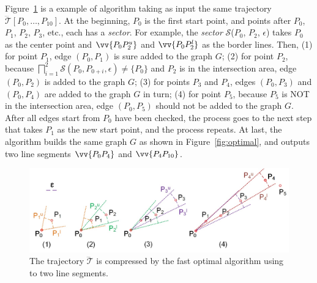 {\begin{example}
	\label{exm-alg-optped}
	Figure~\ref{fig:optped} is a example of algorithm {\optp} taking as input the same trajectory $\dddot{\mathcal{T}}[P_0, \ldots, P_{10}]$. At the beginning, $P_0$ is the first start point, and points after $P_0$, \ie $P_1$, $P_2$, $P_3$, etc., each has a \emph{sector}. For example, the \emph{sector} $\mathcal{S}$($P_0$, $P_{2}$, $\epsilon$) takes $P_0$ as the center point and $\vv{P_0P^u_{2}}$ and $\vv{P_0P^l_{2}}$ as the border lines.
	Then, (1) for point $P_1$, edge $(P_0, P_1)$ is sure added to the graph $G$;
	(2) for point $P_2$, because $\bigsqcap_{i=1}^{2}\mathcal{S}(P_0, P_{0+i}, \epsilon) \ne \{P_0\}$ and $P_2$ is in the intersection area, edge $(P_0, P_2)$ is added to the graph $G$;
	(3) for points $P_3$ and $P_4$, edges $(P_0, P_3)$ and $(P_0, P_4)$ are added to the graph $G$ in turn;
	(4) for point $P_5$, because $P_5$ is NOT in the intersection area, edge $(P_0, P_5)$ should not be added to the graph $G$.
	After all edges start from $P_0$ have been checked, the process goes to the next step that takes $P_1$ as the new start point, and the process repeats.
	At last, the algorithm builds the same graph $G$ as shown in Figure~\ref{fig:optimal}, and outputs two line segments $\vv{P_0P_4}$ and $\vv{P_4P_{10}}$.
\end{example}

\begin{figure}[tb!]
	\centering
	\hspace{-1ex}\includegraphics[scale=0.66]{Figures/Fig-OptPed.jpg}\vspace{-3ex}
	\caption{\small The trajectory $\dddot{\mathcal{T}}$ is compressed by the fast optimal algorithm using \ped to two line segments.}	\vspace{-3ex}
	\label{fig:optped}
\end{figure}

}

